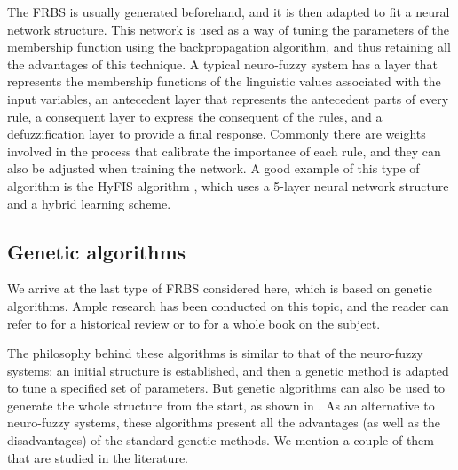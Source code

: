 The FRBS is usually generated beforehand, and it is then adapted to fit a neural network structure. This network is used as a way of tuning the parameters of the membership function using the backpropagation algorithm, and thus retaining all the advantages of this technique. A typical neuro-fuzzy system has a layer that represents the membership functions of the linguistic values associated with the input variables, an antecedent layer that represents the antecedent parts of every rule, a consequent layer to express the consequent of the rules, and a defuzzification layer to provide a final response. Commonly there are weights involved in the process that calibrate the importance of each rule, and they can also be adjusted when training the network. A good example of this type of algorithm is the HyFIS algorithm \cite{kasabov1999hyfis}, which uses a 5-layer neural network structure and a hybrid learning scheme.

\subsection{Genetic algorithms}

We arrive at the last type of FRBS considered here, which is based on genetic algorithms. Ample research has been conducted on this topic, and the reader can refer to \cite{cordon2011historical} for a historical review or to \cite{cordon2001genetic} for a whole book on the subject.

The philosophy behind these algorithms is similar to that of the neuro-fuzzy systems: an initial structure is established, and then a genetic method is adapted to tune a specified set of parameters. But genetic algorithms can also be used to generate the whole structure from the start, as shown in \cite{cordon2001generating}. As an alternative to neuro-fuzzy systems, these algorithms present all the advantages (as well as the disadvantages) of the standard genetic methods. We mention a couple of them that are studied in the literature.

